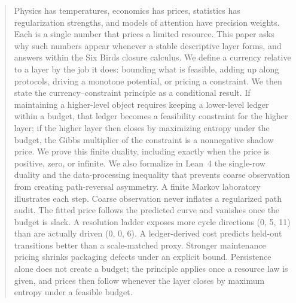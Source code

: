 \maketitle
\thispagestyle{firstpage}

\begin{abstract}
Physics has temperatures, economics has prices, statistics has regularization strengths, and models of attention have precision weights. Each is a single number that prices a limited resource. This paper asks why such numbers appear whenever a stable descriptive layer forms, and answers within the Six Birds closure calculus. We define a currency relative to a layer by the job it does: bounding what is feasible, adding up along protocols, driving a monotone potential, or pricing a constraint. We then state the currency--constraint principle as a conditional result. If maintaining a higher-level object requires keeping a lower-level ledger within a budget, that ledger becomes a feasibility constraint for the higher layer; if the higher layer then closes by maximizing entropy under the budget, the Gibbs multiplier of the constraint is a nonnegative shadow price. We prove this finite duality, including exactly when the price is positive, zero, or infinite. We also formalize in Lean~4 the single-row duality and the data-processing inequality that prevents coarse observation from creating path-reversal asymmetry. A finite Markov laboratory illustrates each step. Coarse observation never inflates a regularized path audit. The fitted price follows the predicted curve and vanishes once the budget is slack. A resolution ladder exposes more cycle directions (0, 5, 11) than are actually driven (0, 0, 6). A ledger-derived cost predicts held-out transitions better than a scale-matched proxy. Stronger maintenance pricing shrinks packaging defects under an explicit bound. Persistence alone does not create a budget; the principle applies once a resource law is given, and prices then follow whenever the layer closes by maximum entropy under a feasible budget.
\end{abstract}
